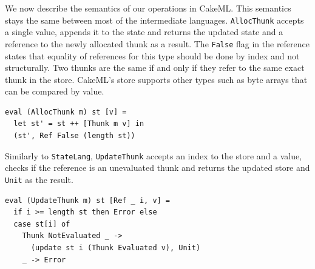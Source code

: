 \documentclass[sigconf]{acmart}
\newcommand{\hsinl}[1]{\texttt{#1}}
\newcommand{\code}[1]{\texttt{#1}}
\newcommand{\StateLang}{\code{StateLang}}
\begin{document}
We now describe the semantics of our operations in CakeML. This semantics stays
the same between most of the intermediate languages. \hsinl{AllocThunk} accepts
a single value, appends it to the state and returns the updated state and a
reference to the newly allocated thunk as a result. The \hsinl{False} flag in
the reference states that equality of references for this type should be done
by index and not structurally. Two thunks are the same if and only if they refer
to the same exact thunk in the store. CakeML's store supports other types such
as byte arrays that can be compared by value.
\begin{verbatim}
eval (AllocThunk m) st [v] =
  let st' = st ++ [Thunk m v] in
  (st', Ref False (length st))
\end{verbatim}
Similarly to \StateLang{}, \hsinl{UpdateThunk} accepts an index to the store and
a value, checks if the reference is an unevaluated thunk and returns the updated
store and \hsinl{Unit} as the result.
\begin{verbatim}
eval (UpdateThunk m) st [Ref _ i, v] =
  if i >= length st then Error else
  case st[i] of
    Thunk NotEvaluated _ ->
      (update st i (Thunk Evaluated v), Unit)
    _ -> Error
\end{verbatim}
\end{document}
